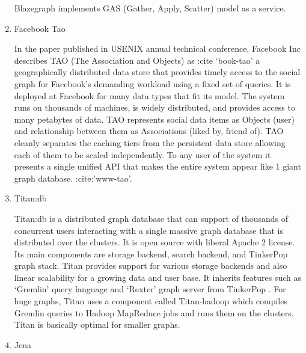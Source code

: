 \begin{enumerate}
\begin{description}
\end{description}

 Blazegraph implements GAS (Gather, Apply,
Scatter) model as a service.

\item {} 
Facebook Tao

In the paper published in USENIX annual technical conference,
Facebook Inc describes TAO (The Association and Objects) as :cite
‘book-tao’ a geographically distributed data store that provides
timely access to the social graph for Facebook’s demanding
workload using a fixed set of queries. It is deployed at Facebook
for many data types that fit its model. The system runs on
thousands of machines, is widely distributed, and provides access
to many petabytes of data. TAO represents social data items as
Objects (user) and relationship between them as Associations
(liked by, friend of).  TAO cleanly separates the caching tiers
from the persistent data store allowing each of them to be scaled
independently. To any user of the system it presents a single
unified API that makes the entire system appear like 1 giant
graph database. :cite:'www-tao'.

\item {} 
Titan:db

Titan:db \label{\detokenize{i524/technologies:id461}}{\hyperref[\detokenize{i524/technologies:www-titan}]{\sphinxcrossref{{[}395{]}}}} is a distributed graph database that
can support of thousands of concurrent users interacting with a
single massive graph database that is distributed over the
clusters. It is open source with liberal Apache 2 license.  Its
main components are storage backend, search backend, and
TinkerPop graph stack. Titan provides support for various
storage backends and also linear scalability for a growing data
and user base. It inherits features such as ‘Gremlin’ query
language and ‘Rexter’ graph server from TinkerPop
\label{\detokenize{i524/technologies:id462}}{\hyperref[\detokenize{i524/technologies:www-tinkerpop}]{\sphinxcrossref{{[}396{]}}}}.  For huge graphs, Titan uses a component
called Titan-hadoop which compiles Gremlin queries to Hadoop
MapReduce jobs and runs them on the clusters. Titan is basically
optimal for smaller graphs.

\item {} 
Jena


\end{enumerate}
